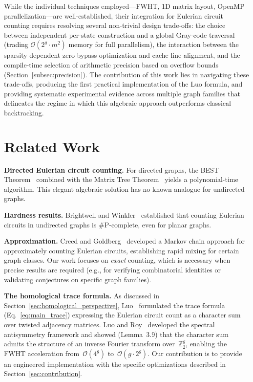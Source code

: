 \documentclass[acmsmall,review]{acmart}
\newcommand{\bigO}{\mathcal{O}}
\begin{document}
	While the individual techniques employed---FWHT, 1D matrix layout, OpenMP parallelization---are well-established, their integration for Eulerian circuit counting requires resolving several non-trivial design trade-offs: the choice between independent per-state construction and a global Gray-code traversal (trading $\bigO(2^g \cdot m^2)$ memory for full parallelism), the interaction between the sparsity-dependent zero-bypass optimization and cache-line alignment, and the compile-time selection of arithmetic precision based on overflow bounds (Section~\ref{subsec:precision}). The contribution of this work lies in navigating these trade-offs, producing the first practical implementation of the Luo formula, and providing systematic experimental evidence across multiple graph families that delineates the regime in which this algebraic approach outperforms classical backtracking.
	
	\section{Related Work}
	\label{sec:related_work}
	
	\textbf{Directed Eulerian circuit counting.} For directed graphs, the BEST Theorem~\cite{Tutte1941, deBruijn1951} combined with the Matrix Tree Theorem~\cite{Kirchhoff1847} yields a polynomial-time algorithm. This elegant algebraic solution has no known analogue for undirected graphs.
	
	\textbf{Hardness results.} Brightwell and Winkler~\cite{Brightwell2005, Brightwell2010} established that counting Eulerian circuits in undirected graphs is \#P-complete, even for planar graphs.
	
	\textbf{Approximation.} Creed and Goldberg~\cite{CreedGoldberg2013} developed a Markov chain approach for approximately counting Eulerian circuits, establishing rapid mixing for certain graph classes. Our work focuses on \emph{exact} counting, which is necessary when precise results are required (e.g., for verifying combinatorial identities or validating conjectures on specific graph families).
	
	\textbf{The homological trace formula.} As discussed in Section~\ref{sec:homological_perspective}, Luo~\cite{Luo2025} formulated the trace formula (Eq.~\eqref{eq:main_trace}) expressing the Eulerian circuit count as a character sum over twisted adjacency matrices. Luo and Roy~\cite{LR24} developed the spectral antisymmetry framework and showed (Lemma~3.9) that the character sum admits the structure of an inverse Fourier transform over~$\mathbb{Z}_2^g$, enabling the FWHT acceleration from~$\bigO(4^g)$ to~$\bigO(g\cdot 2^g)$. Our contribution is to provide an engineered implementation with the specific optimizations described in Section~\ref{sec:contribution}.
	
\end{document}

